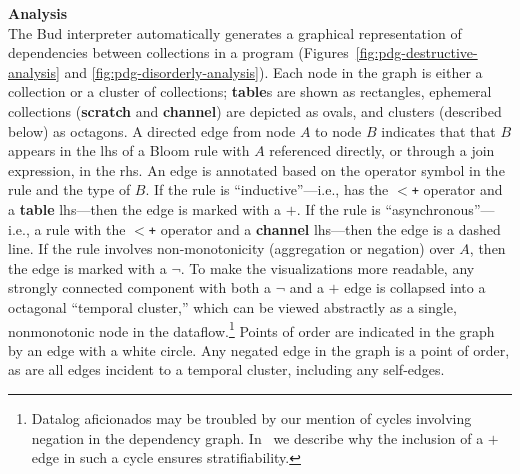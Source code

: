\noindent
\textbf{Analysis}\\
\noindent
The Bud interpreter automatically generates a graphical
representation of dependencies between collections in a program
(Figures~\ref{fig:pdg-destructive-analysis} and \ref{fig:pdg-disorderly-analysis}).
Each node in the graph is either a collection or a cluster of collections; \textbf{table}s are shown as rectangles, ephemeral
collections (\textbf{scratch} and \textbf{channel}) are depicted as ovals, and clusters (described below) as octagons.  A
directed edge from node $A$ to node $B$ indicates that that $B$ appears in the
lhs of a Bloom rule with $A$ referenced directly, or through a join expression,
in the rhs.  An edge is annotated based on the operator symbol in the rule and
the type of $B$.  If the rule is ``inductive''---i.e., has the \texttt{$<$+}
operator and a {\bf table} lhs---then the edge is marked with a $+$.  If the
rule is ``asynchronous''---i.e., a rule with the \texttt{$<$+} operator and a {\bf
channel} lhs---then the edge is a dashed line.  If the rule involves
non-monotonicity (aggregation or negation) over $A$, then the edge is marked with a $\lnot$.
To make the visualizations more readable, any strongly connected component with both a $\lnot$ and a $+$ edge is collapsed into a octagonal ``temporal cluster,'' 
which can be viewed abstractly as a single, nonmonotonic node in the 
dataflow.\footnote{Datalog aficionados may be troubled by our mention of cycles
involving negation in the dependency graph.  In~\cite{dedalus-techr} we
describe why the inclusion of a $+$ edge in such a cycle ensures stratifiability.}
Points of order are indicated in the graph by an edge with a white circle.
 Any negated edge in the graph is a point of order, as are all edges incident to a temporal cluster, including any self-edges.



